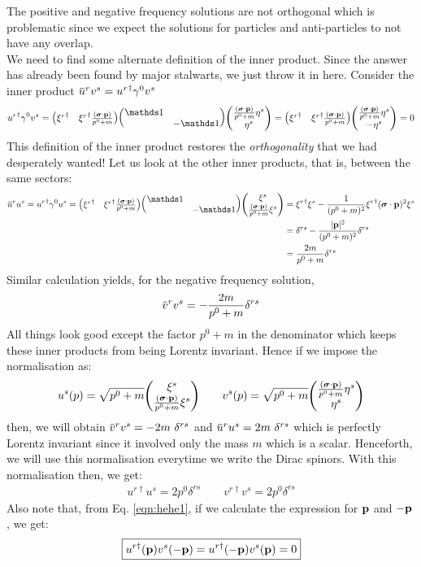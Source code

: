 The positive and negative frequency solutions are not orthogonal which is problematic since we expect the solutions for particles and anti-particles to not have any overlap. \\[0.2cm]
We need to find some alternate definition of the inner product. Since the answer has already been found by major stalwarts, we just throw it in here. Consider the inner product $\dadj{u}^r v^s = {u^r}^\dagger \gamma^0 v^s$
\begin{align*}
    {u^r}^\dagger \gamma^0 v^s =  \mqty({\xi^r}^\dagger & {\xi^r}^\dagger\frac{(\bs{\sigma}\cdot \vb{p})}{{p^0}+m}) \mqty(\iden & \\ & -\iden)\mqty(\frac{(\bs{\sigma}\cdot \vb{p})}{{p^0}+m}\eta^s\\ \eta^s) =  \mqty({\xi^r}^\dagger & {\xi^r}^\dagger\frac{(\bs{\sigma}\cdot \vb{p})}{{p^0}+m})\mqty(\frac{(\bs{\sigma}\cdot \vb{p})}{{p^0}+m}\eta^s \\ -\eta^s) =0
\end{align*}
This definition of the inner product restores the \textit{orthogonality} that we had desperately wanted! Let us look at the other inner products, that is, between the same sectors: 
\begin{align*}
    \dadj{u}^r u^s = {u^r}^\dagger\gamma^0 u^s =\mqty({\xi^r}^\dagger & {\xi^r}^\dagger\frac{(\bs{\sigma}\cdot \vb{p})}{{p^0}+m})\mqty(\iden & \\ & -\iden)  \mqty(\xi^s \\ \frac{(\bs{\sigma}\cdot \vb{p})}{{p^0}+m}\xi^s) &= {\xi^r}^\dagger{\xi^s} - \frac{1}{({p^0}+m)^2}{\xi^r}^\dagger(\bs{\sigma}\cdot \vb{p})^2 {\xi^s}\\ &= \delta^{rs} - \frac{|\vb{p}|^2}{({p^0}+m)^2}\delta^{rs}\\ &= \frac{2m}{p^0+m}\delta^{rs}
\end{align*}
Similar calculation yields, for the negative frequency solution,
$$\dadj{v}^r v^s = -\frac{2m}{p^0+m}\delta^{rs}$$
All things look good except the factor $p^0+m$ in the denominator which keeps these inner products from being Lorentz invariant. Hence if we impose the normalisation as:
$$u^s(p) =\sqrt{p^0+m} \mqty(\xi^s \\ \frac{(\bs{\sigma}\cdot \vb{p})}{{p^0}+m}\xi^s)\qquad v^s(p)=\sqrt{p^0+m}\mqty(\frac{(\bs{\sigma}\cdot \vb{p})}{{p^0}+m}\eta^s\\ \eta^s)$$
then, we will obtain $\dadj{v}^r v^s = -2m\ \delta^{rs}$ and $\dadj{u}^r u^s = 2m\ \delta^{rs}$ which is perfectly Lorentz invariant since it involved only the mass $m$ which is a scalar. Henceforth, we will use this normalisation everytime we write the Dirac spinors. With this normalisation then, we get:
\begin{align}\label{eqn:innerspinor}
    \boxed{u^{r\dagger} u^s = 2p^0 \delta^{rs}}\qquad  \boxed{v^{r\dagger} v^s = 2p^0 \delta^{rs}}
\end{align}
Also note that, from Eq. \ref{eqn:hehe1}, if we calculate the expression for $\vb{p}$ and $-\vb{p}$ , we get:
\begin{align}\label{eqn:innerspinor1}
   \boxed{ u^{r\dagger}(\vb{p})v^s(-\vb{p}) = u^{r\dagger}(-\vb{p})v^s(\vb{p}) =0}
\end{align}

